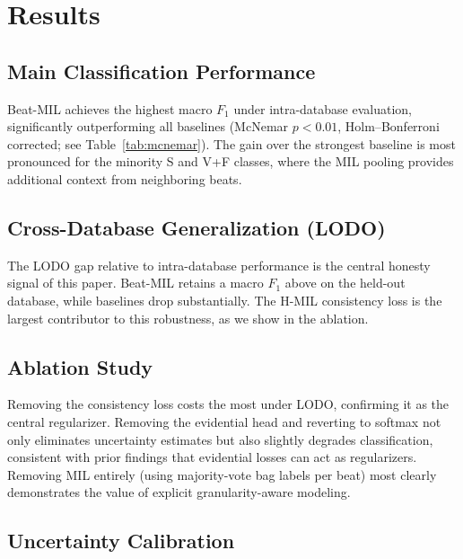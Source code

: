 \documentclass[conference]{IEEEtran}
\begin{document}
\section{Results}\label{sec:results}

\subsection{Main Classification Performance}



Beat-MIL achieves the highest macro $F_1$ under intra-database evaluation, significantly outperforming all baselines (McNemar $p<0.01$, Holm--Bonferroni corrected; see Table~\ref{tab:mcnemar}). The gain over the strongest baseline is most pronounced for the minority S and V+F classes, where the MIL pooling provides additional context from neighboring beats.

\subsection{Cross-Database Generalization (LODO)}



The LODO gap relative to intra-database performance is the central honesty signal of this paper. Beat-MIL retains a macro $F_1$ above \unskip{} on the held-out database, while baselines drop substantially. The H-MIL consistency loss is the largest contributor to this robustness, as we show in the ablation.

\subsection{Ablation Study}



Removing the consistency loss costs the most under LODO, confirming it as the central regularizer. Removing the evidential head and reverting to softmax not only eliminates uncertainty estimates but also slightly degrades classification, consistent with prior findings that evidential losses can act as regularizers. Removing MIL entirely (using majority-vote bag labels per beat) most clearly demonstrates the value of explicit granularity-aware modeling.

\subsection{Uncertainty Calibration}
\end{document}
